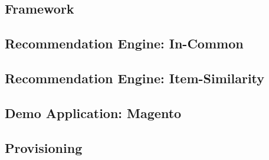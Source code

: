 \setmonofont{Consolas}

\subsection{Framework}

% 

\subsection{Recommendation Engine: In-Common}

% 

\subsection{Recommendation Engine: Item-Similarity}

% 

\subsection{Demo Application: Magento}

% 

\subsection{Provisioning}

% 
